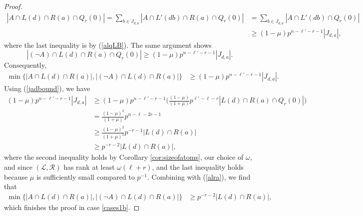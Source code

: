 \documentclass[12pt,oneside,british,a4wide]{amsart}
\numberwithin{equation}{section}
\theoremstyle{definition}
\newcommand{\calL}{\mathcal{L}}
\newcommand{\calR}{\mathcal{R}}
\begin{document}
\begin{proof}
\begin{align*}
 |A\cap L(d)\cap R(a)\cap Q_r(0)|=\sum_{b\in J_{d,a}}|A\cap L'(db)\cap R(a)\cap Q_r(0)|&=\sum_{b\in J_{d,a}}|A\cap L'(db)\cap Q_r(0)|\\
 &\geq (1-\mu)p^{n-\ell'-r-1}|J_{d,a}|,
 \end{align*}
where the last inequality is by (\ref{alqLB}). The same argument shows  
$$
 |(\neg A)\cap L(d)\cap R(a)\cap Q_r(0)|\geq (1-\mu)p^{n-\ell'-r-1} |J_{d,a}|.
 $$
   Consequently,
 \begin{align}\label{alra}
\min\{|A\cap L(d)\cap R(a)|,|(\neg A)\cap L(d)\cap R(a)|\}&\geq (1-\mu)p^{n-\ell'-r-1}|J_{d,a}|.
\end{align}
Using (\ref{jadbound}), we have
\begin{align*}
(1-\mu)p^{n-\ell'-r-1} |J_{d,a}|&\geq (1-\mu)p^{n-\ell'-r-1} \Big(\frac{(1-\mu)}{(1+\mu)}p^{\ell'-\ell-r}|L(d)\cap R(a)\cap Q_{r}(0)|\Big)\\ 
&=\frac{(1-\mu)^2}{(1+\mu)} p^{n-\ell-2r-1}\\
&\geq \frac{(1-\mu)^2}{(1+\mu)^2}p^{-r-1}|L(d)\cap R(a)|\\
&\geq p^{-r-2}|L(d)\cap R(a)|,
\end{align*}
where the second inequality  holds by Corollary \ref{cor:sizeofatoms},  our choice of $\omega$, and since $(\calL,\calR)$ has rank at least $\omega(\ell+r)$, and the last  inequality  holds because $\mu$ is sufficiently small compared to $p^{-1}$.  Combining with (\ref{alra}), we find that 
 \begin{align*}
\min \{|A\cap L(d)\cap R(a)|, |(\neg A)\cap L(d)\cap R(a)| \}&\geq  p^{-r-2}|L(d)\cap R(a)|,
\end{align*} 
which finishes the proof in case \ref{cases1b}.



\end{proof}
\end{document}
